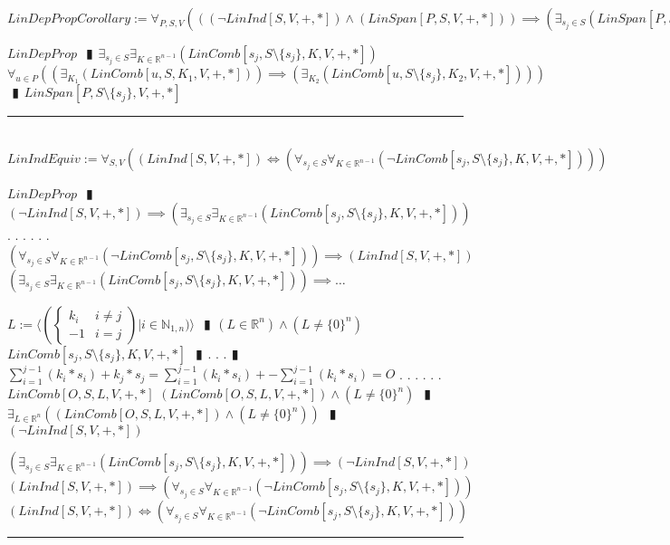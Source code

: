 \documentclass{book}
\newcommand{\abr}{:=}
\newcommand{\cont}{\phantom{.}. . .\phantom{.}}
\newcommand{\pipe}{$\phantom{(}\vrectangleblack\phantom{)}$}
\begin{document}
$LinDepPropCorollary \abr \forall_{P, S, V}(((\lnot LinInd[S, V, +, *]) \land (LinSpan[P, S, V, +, *])) \implies (\exists_{s_j \in S}(LinSpan[P, S \setminus \{s_j\}, V, +, *])))$
\begin{enumerate}
  \lit $LinDepProp$ \pipe $\exists_{s_j \in S} \exists_{K \in \mathbb{R}^{n - 1}}(LinComb[s_j, S \setminus \{s_j\}, K, V, +, *])$
  \lit $\forall_{u \in P}((\exists_{K_1}(LinComb[u, S, K_1, V, +, *])) \implies (\exists_{K_2}(LinComb[u, S \setminus \{s_j\}, K_2, V, +, *])))$ \pipe $LinSpan[P, S \setminus \{s_j\}, V, +, *]$
\end{enumerate} \vspace{.75mm} \hrule \vspace{.75mm} \ \\ 

$LinIndEquiv \abr \forall_{S, V}((LinInd[S, V, +, *]) \iff (\forall_{s_j \in S} \forall_{K \in \mathbb{R}^{n - 1}}(\lnot LinComb[s_j, S \setminus \{s_j\}, K, V, +, *])))$
\begin{enumerate}
  \lit $LinDepProp$ \pipe $(\lnot LinInd[S, V, +, *]) \implies (\exists_{s_j \in S} \exists_{K \in \mathbb{R}^{n - 1}}(LinComb[s_j, S \setminus \{s_j\}, K, V, +, *]))$ \cont
  \lit \cont $(\forall_{s_j \in S} \forall_{K \in \mathbb{R}^{n - 1}}(\lnot LinComb[s_j, S \setminus \{s_j\}, K, V, +, *])) \implies (LinInd[S, V, +, *])$
  \lit $(\exists_{s_j \in S} \exists_{K \in \mathbb{R}^{n - 1}}(LinComb[s_j, S \setminus \{s_j\}, K, V, +, *])) \implies \ldots$
  \begin{enumerate}
    \lit $L \abr \langle \left(\begin{cases} 
      k_i & i \neq j \\
      -1 & i = j 
    \end{cases}\right) | i \in \mathbb{N}_{1, n}) \rangle$ \pipe $(L \in \mathbb{R}^n) \land (L \neq \{0\}^n)$
    \lit $LinComb[s_j, S \setminus \{s_j\}, K, V, +, *]$ \pipe \cont  \pipe $\sum_{i = 1}^{j - 1}(k_i * s_i) + k_j * s_j = \sum_{i = 1}^{j - 1}(k_i * s_i) + -\sum_{i = 1}^{j - 1}(k_i * s_i) = O$ \cont
    \lit \cont $LinComb[O, S, L, V, +, *]$
    \lit $(LinComb[O, S, L, V, +, *]) \land (L \neq \{0\}^n)$ \pipe $\exists_{L \in \mathbb{R}^n}((LinComb[O, S, L, V, +, *]) \land (L \neq \{0\}^n))$ \pipe $(\lnot LinInd[S, V, +, *])$
  \end{enumerate}
  \lit $(\exists_{s_j \in S} \exists_{K \in \mathbb{R}^{n - 1}}(LinComb[s_j, S \setminus \{s_j\}, K, V, +, *])) \implies (\lnot LinInd[S, V, +, *])$
  \lit $(LinInd[S, V, +, *]) \implies (\forall_{s_j \in S} \forall_{K \in \mathbb{R}^{n - 1}}(\lnot LinComb[s_j, S \setminus \{s_j\}, K, V, +, *]))$
  \lit $(LinInd[S, V, +, *]) \iff (\forall_{s_j \in S} \forall_{K \in \mathbb{R}^{n - 1}}(\lnot LinComb[s_j, S \setminus \{s_j\}, K, V, +, *]))$
\end{enumerate} \vspace{.75mm} \hrule \vspace{.75mm} \ \\ 
\end{document}
